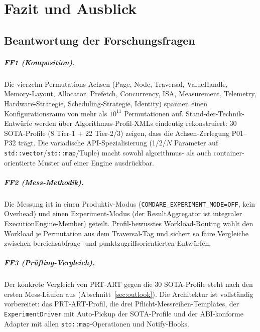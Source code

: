 \chapter{Fazit und Ausblick}\label{ch:conclusion}

\section{Beantwortung der Forschungsfragen}\label{sec:answers}

\paragraph{FF1 (Komposition).} Die vierzehn Permutations-Achsen (Page, Node, Traversal,
ValueHandle, Memory-Layout, Allocator, Prefetch, Concurrency, ISA, Measurement, Telemetry,
Hardware-Strategie, Scheduling-Strategie, Identity) spannen einen Konfigurationsraum von mehr
als $10^{11}$ Permutationen auf. Stand-der-Technik-Entwürfe werden über
Algorithmus-Profil-XMLs eindeutig rekonstruiert: 30 SOTA-Profile (8 Tier-1 + 22 Tier-2/3)
zeigen, dass die Achsen-Zerlegung P01--P32 trägt. Die variadische API-Spezialisierung
(1/2/$N$ Parameter auf \texttt{std::vector}/\texttt{std::map}/Tuple) macht sowohl
algorithmus- als auch container-orientierte Muster auf einer Engine ausdrückbar.

\paragraph{FF2 (Mess-Methodik).} Die Messung ist in einen Produktiv-Modus
(\texttt{COMDARE\_EXPERIMENT\_MODE=OFF}, kein Overhead) und einen Experiment-Modus (der
ResultAggregator ist integraler ExecutionEngine-Member) geteilt. Profil-bewusstes
Workload-Routing wählt den Workload je Permutation aus dem Traversal-Tag und sichert so faire
Vergleiche zwischen bereichsabfrage- und punktzugriffsorientierten Entwürfen.

\paragraph{FF3 (Prüfling-Vergleich).} Der konkrete Vergleich von PRT-ART gegen die 30
SOTA-Profile steht nach den ersten Mess-Läufen aus (Abschnitt~\ref{sec:outlook}). Die
Architektur ist vollständig vorbereitet: das PRT-ART-Profil, die drei
Pflicht-Messreihen-Templates, der \texttt{ExperimentDriver} mit Auto-Pickup der SOTA-Profile
und der ABI-konforme Adapter mit allen \texttt{std::map}-Operationen und Notify-Hooks.

